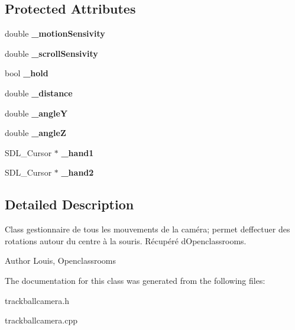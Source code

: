 \subsection*{Protected Attributes}
\begin{DoxyCompactItemize}
\item 
\mbox{\label{class_track_ball_camera_a097812817ed3ec665c76a38f71d8e133}} 
double {\bfseries \+\_\+motion\+Sensivity}
\item 
\mbox{\label{class_track_ball_camera_ac24ec13cfb6134d7e064ba1052f08e23}} 
double {\bfseries \+\_\+scroll\+Sensivity}
\item 
\mbox{\label{class_track_ball_camera_a266fb5bce739065590ea94af85f6db96}} 
bool {\bfseries \+\_\+hold}
\item 
\mbox{\label{class_track_ball_camera_aeceb35b6b038fa4f756e5098b37ef9f4}} 
double {\bfseries \+\_\+distance}
\item 
\mbox{\label{class_track_ball_camera_ad126b1c4d4e9e6bd8942015e7a19ebcc}} 
double {\bfseries \+\_\+angleY}
\item 
\mbox{\label{class_track_ball_camera_a785783601aa752acffad8c227a486271}} 
double {\bfseries \+\_\+angleZ}
\item 
\mbox{\label{class_track_ball_camera_ae9e9a83186de591c76ff43c7a1222d2b}} 
S\+D\+L\+\_\+\+Cursor $\ast$ {\bfseries \+\_\+hand1}
\item 
\mbox{\label{class_track_ball_camera_a3cf8251a5a65b3cf5b93ddbf811d165c}} 
S\+D\+L\+\_\+\+Cursor $\ast$ {\bfseries \+\_\+hand2}
\end{DoxyCompactItemize}


\subsection{Detailed Description}
Class gestionnaire de tous les mouvements de la caméra; permet d\textquotesingle{}effectuer des rotations autour du centre à la souris. Récupéré d\textquotesingle{}Openclassrooms. \begin{DoxyAuthor}{Author}
Louis, Openclassrooms 
\end{DoxyAuthor}


The documentation for this class was generated from the following files\+:\begin{DoxyCompactItemize}
\item 
trackballcamera.\+h\item 
trackballcamera.\+cpp\end{DoxyCompactItemize}
